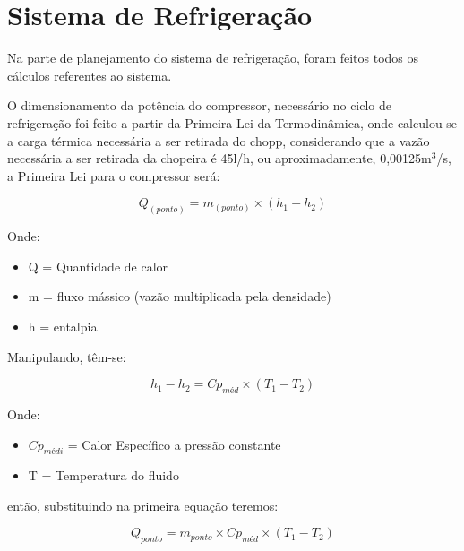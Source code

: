         \section[Sistema de Refrigeração]{Sistema de Refrigeração}

            Na parte de planejamento do sistema de refrigeração, foram feitos todos os
            cálculos referentes ao sistema. 

            O dimensionamento da potência do compressor, necessário no ciclo de
            refrigeração foi feito a partir da Primeira Lei da Termodinâmica, onde calculou-se a
            carga térmica necessária a ser retirada do chopp, considerando que a vazão
            necessária a ser retirada da chopeira é 45l/h, ou aproximadamente, 0,00125m$^3$/s, a
            Primeira Lei para o compressor será:
            
            \begin{equation}
                Q_{(ponto)} = m_{(ponto)} \times (h_1 - h_2)
            \end{equation}

            Onde:
            \begin{itemize}
                \item Q = Quantidade de calor
                \item m = fluxo mássico (vazão multiplicada pela densidade)
                \item h = entalpia
            \end{itemize}
            
            Manipulando, têm-se:

            \begin{equation}
                h_1 - h_2 = Cp_{méd} \times (T_1 - T_2)
            \end{equation}

            Onde:
            \begin{itemize}
                \item $Cp_{médi}$ = Calor Específico a pressão constante
                \item T = Temperatura do fluido
            \end{itemize}
            então, substituindo na primeira equação teremos:

            \begin{equation}
                Q_{ponto} = m_{ponto} \times Cp_{méd} \times (T_1 - T_2)
            \end{equation}

